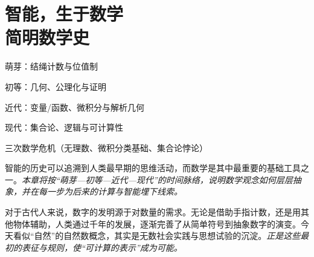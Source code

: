 
\chapter{智能，生于数学 \texorpdfstring{\\}{ }简明数学史}

\newenvironment{examplebox}
{\par\vspace{0.5em}\noindent\hrulefill\par\noindent{示例盒子：三跳链}\par\small}
{\par\noindent\hrulefill\vspace{0.5em}\normalsize\par}

\begin{introduction}
\item 萌芽：结绳计数与位值制
\item 初等：几何、公理化与证明
\item 近代：变量/函数、微积分与解析几何
\item 现代：集合论、逻辑与可计算性
\item 三次数学危机（无理数、微积分类基础、集合论悖论）
\end{introduction}



智能的历史可以追溯到人类最早期的思维活动，而数学是其中最重要的基础工具之一。\emph{本章将按“萌芽—初等—近代—现代”的时间脉络，说明数学观念如何层层抽象，并在每一步为后来的计算与智能埋下线索。}

对于古代人来说，数字的发明源于对数量的需求。无论是借助手指计数，还是用其他物体辅助，人类通过千年的发展，逐渐完善了从简单符号到抽象数字的演变。今天看似“自然”的自然数概念，其实是无数社会实践与思想试验的沉淀。\emph{正是这些最初的表征与规则，使“可计算的表示”成为可能。}

